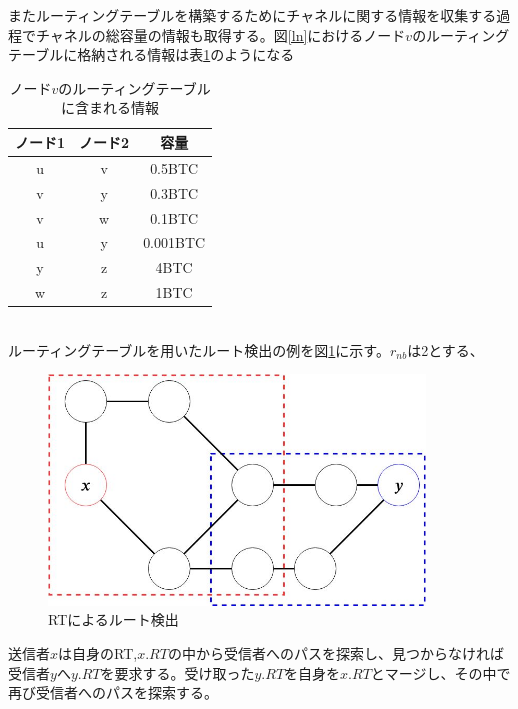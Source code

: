 \documentclass[12pt]{jarticle}
\begin{document}
またルーティングテーブルを構築するためにチャネルに関する情報を収集する過程でチャネルの総容量の情報も取得する。図\ref{ln}におけるノード$v$のルーティングテーブルに格納される情報は表\ref{rt_samp}のようになる
\\
\begin{table}[h]
\centering
\caption{ノード$v$のルーティングテーブルに含まれる情報}
\begin{tabular}{cc|c}
ノード1 & ノード2 & 容量 \\
\hline
u & v & 0.5BTC \\
v & y & 0.3BTC \\
v & w & 0.1BTC \\
u & y & 0.001BTC \\
y & z & 4BTC \\
w & z & 1BTC \\
\end{tabular}
\label{rt_samp}
\end{table}
\\
ルーティングテーブルを用いたルート検出の例を図\ref{rt}に示す。$r_{nb}$は2とする、

\begin{figure}[h]
 \centering
   \includegraphics[width=100mm]{figures/RT.jpg}
 \caption{RTによるルート検出}
 \label{rt}
\end{figure}

送信者$x$は自身のRT,$x.RT$の中から受信者へのパスを探索し、見つからなければ受信者$y$へ$y.RT$を要求する。受け取った$y.RT$を自身を$x.RT$とマージし、その中で再び受信者へのパスを探索する。
\end{document}

